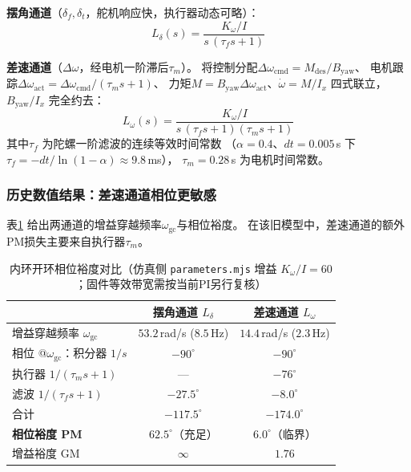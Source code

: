 \textbf{摆角通道}（$\delta_f,\delta_t$，舵机响应快，执行器动态可略）：
\begin{equation}
    L_\delta(s) = \frac{K_\omega/I}{s\,(\tau_f s + 1)}
    \label{eq:pm_servo}
\end{equation}

\textbf{差速通道}（$\Delta\omega$，经电机一阶滞后$\tau_m$）。
将控制分配$\Delta\omega_{\mathrm{cmd}}=M_{\mathrm{des}}/B_{\mathrm{yaw}}$、
电机跟踪$\Delta\omega_{\mathrm{act}}=\Delta\omega_{\mathrm{cmd}}/(\tau_m s+1)$、
力矩$M=B_{\mathrm{yaw}}\Delta\omega_{\mathrm{act}}$、$\dot\omega=M/I_x$
四式联立，$B_{\mathrm{yaw}}/I_x$ 完全约去：
\begin{equation}
    L_\omega(s) = \frac{K_\omega/I}{s\,(\tau_f s + 1)(\tau_m s + 1)}
    \label{eq:pm_diff}
\end{equation}
其中$\tau_f$ 为陀螺一阶滤波的连续等效时间常数
（$\alpha=0.4$、$dt=0.005$\,s 下$\tau_f=-dt/\ln(1-\alpha)\approx 9.8$\,ms），
$\tau_m=0.28$\,s 为电机时间常数。

\subsubsection{历史数值结果：差速通道相位更敏感}

表\ref{tab:pm_compare} 给出两通道的增益穿越频率$\omega_{\mathrm{gc}}$与相位裕度。
在该旧模型中，差速通道的额外PM损失主要来自执行器$\tau_m$。

\begin{table}[htbp]
\centering
\caption{内环开环相位裕度对比（仿真侧 \texttt{parameters.mjs} 增益 $K_\omega/I=60$；固件等效带宽需按当前PI另行复核）}
\label{tab:pm_compare}
\begin{tabular}{lcc}
\hline
 & 摆角通道 $L_\delta$ & 差速通道 $L_\omega$ \\
\hline
增益穿越频率 $\omega_{\mathrm{gc}}$ & $53.2$\,rad/s ($8.5$\,Hz) & $14.4$\,rad/s ($2.3$\,Hz) \\
相位 @$\omega_{\mathrm{gc}}$：积分器 $1/s$ & $-90^\circ$ & $-90^\circ$ \\
\quad 执行器 $1/(\tau_m s+1)$ & --- & $-76^\circ$ \\
\quad 滤波 $1/(\tau_f s+1)$ & $-27.5^\circ$ & $-8.0^\circ$ \\
\quad 合计 & $-117.5^\circ$ & $-174.0^\circ$ \\
\textbf{相位裕度 PM} & $\mathbf{62.5^\circ}$（充足） & $\mathbf{6.0^\circ}$（临界） \\
增益裕度 GM & $\infty$ & $1.76$ \\
\hline
\end{tabular}
\end{table}

